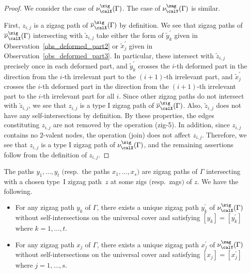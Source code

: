 \begin{proof}
We consider the case of $\nu^\zig_\calX(\Gamma)$. The case of $\nu^\zag_\calY(\Gamma)$ is similar.

First, $z_{i,j}$ is a zigzag path of $\overline{\nu}^\zig_\calX(\Gamma)$ by definition.
We see that zigzag paths of $\overline{\nu}^\zig_\calX(\Gamma)$ intersecting with $\widetilde{z}_{i,j}$ take either the form of $\widetilde{y}_k^\prime$ given in Observation~\ref{obs_deformed_part2} or $\widetilde{x}_j^\prime$ given in Observation~\ref{obs_deformed_part3}.
In particular, these intersect with $\widetilde{z}_{i,j}$ precisely once in each deformed part, and
$\widetilde{y}_k^\prime$ crosses the $i$-th deformed part in the direction from the $i$-th irrelevant part to the $(i+1)$-th irrelevant part, and $\widetilde{x}_j^\prime$ crosses the $i$-th deformed part in the direction from the $(i+1)$-th irrelevant part to the $i$-th irrelevant part for all $i$.
Since other zigzag paths do not intersect with $\widetilde{z}_{i,j}$, we see that $z_{i,j}$ is a type I zigzag path of $\overline{\nu}^\zig_\calX(\Gamma)$.
Also, $\widetilde{z}_{i,j}$ does not have any self-intersections by definition.
By these properties, the edges constituting $z_{i,j}$ are not removed by the operation (zig-5).
In addition, since $z_{i,j}$ contains no $2$-valent nodes, the operation (join) does not affect $z_{i,j}$.
Therefore, we see that $z_{i,j}$ is a type I zigzag path of $\nu^\zig_\calX(\Gamma)$, and the remaining assertions follow from the definition of $z_{i,j}$.
\end{proof}

\begin{Proposition}\label{zigzag_afterdeform1}
The paths $y_1,\dots, y_t$ $($resp.\ the paths $x_1,\dots, x_s)$ are zigzag paths of $\Gamma$ intersecting with a chosen type~I zigzag path~$z$
at some zigs $($resp.\ zags$)$ of $z$. We have the following.
\begin{itemize}\itemsep=0pt
\item[\rm (1)] For any zigzag path $y_k$ of $\Gamma$, there exists a unique zigzag path $y_k^\prime$ of $\nu^\zig_\calX(\Gamma)$ without self-intersections
on the universal cover and satisfying $[y_k]=[y_k^\prime]$ where $k=1,\dots,t$.
\item[\rm (2)] For any zigzag path $x_j$ of $\Gamma$, there exists a unique zigzag path $x_j^\prime$ of $\nu^\zag_\calY(\Gamma)$ without self-intersections
on the universal cover and satisfying $[x_j]=[x_j^\prime]$ where $j=1,\dots,s$.
\end{itemize}
\end{Proposition}

